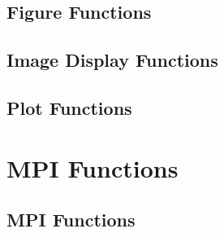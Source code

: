 \documentclass{book}
\begin{document}
\section{Figure Functions}





\section{Image Display Functions}





\section{Plot Functions}








\chapter{MPI Functions}
\section{MPI Functions}














\end{document}
